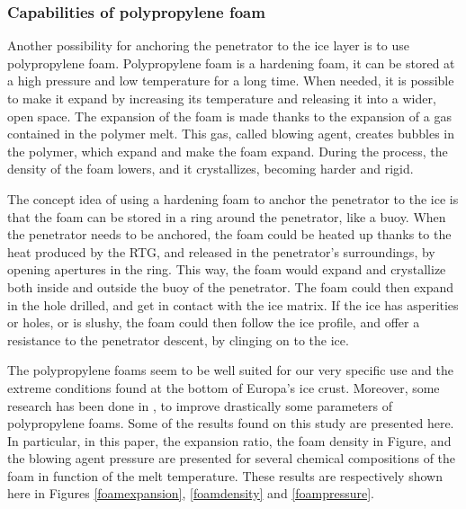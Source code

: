 
\subsubsection{Capabilities of polypropylene foam}

Another possibility for anchoring the penetrator to the ice layer is to use polypropylene foam. Polypropylene foam is a hardening foam, it can be stored at a high pressure and low temperature for a long time. When needed, it is possible to make it expand by increasing its temperature and releasing it into a wider, open space. The expansion of the foam is made thanks to the expansion of a gas contained in the polymer melt. This gas, called blowing agent, creates bubbles in the polymer, which expand and make the foam expand. During the process, the density of the foam lowers, and it crystallizes, becoming harder and rigid.

The concept idea of using a hardening foam to anchor the penetrator to the ice is that the foam can be stored in a ring around the penetrator, like a buoy. When the penetrator needs to be anchored, the foam could be heated up thanks to the heat produced by the RTG, and released in the penetrator's surroundings, by opening apertures in the ring. This way, the foam would expand and crystallize both inside and outside the buoy of the penetrator. The foam could then expand in the hole drilled, and get in contact with the ice matrix. If the ice has asperities or holes, or is slushy, the foam could then follow the ice profile, and offer a resistance to the penetrator descent, by clinging on to the ice.

The polypropylene foams seem to be well suited for our very specific use and the extreme conditions found at the bottom of Europa's ice crust. Moreover, some research has been done in \cite{naguib2002strategies}, to improve drastically some parameters of polypropylene foams. Some of the results found on this study are presented here. In particular, in this paper, the expansion ratio, the foam density in Figure, and the blowing agent pressure are presented for several chemical compositions of the foam in function of the melt temperature. These results are respectively shown here in Figures \ref{foamexpansion}, \ref{foamdensity} and \ref{foampressure}.

